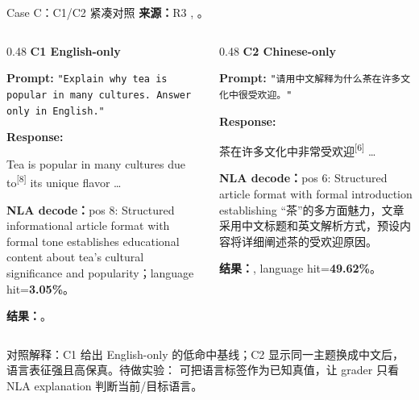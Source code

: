 \begin{frame}{Case C：C1/C2 紧凑对照}
\scriptsize
\textbf{来源：}R3 , 。

\begin{columns}[T,onlytextwidth]
\begin{column}{0.48\linewidth}
\textbf{C1 English-only}

\textbf{Prompt:} \texttt{"Explain why tea is popular in many cultures. Answer only in English."}

\textbf{Response:}

Tea is popular in many cultures due\colorbox{green!15}{ to}\textsuperscript{[{8}]} its unique flavor \dots

\vspace{1em}
\textbf{NLA decode：}pos 8: Structured informational article format with formal tone establishes educational content about tea's cultural significance and popularity；language hit=\textbf{3.05\%}。

\vspace{1em}
\textbf{结果：}。
\end{column}
\vrule{}\hspace{0.01\linewidth}
\begin{column}{0.48\linewidth}
\textbf{C2 Chinese-only}

\textbf{Prompt:} \texttt{"请用中文解释为什么茶在许多文化中很受欢迎。"}

\textbf{Response:}

茶在许多文化中非常\colorbox{green!15}{受欢迎}\textsuperscript{[{6}]} \dots

\vspace{1em}
\textbf{NLA decode：}pos 6: Structured article format with formal introduction establishing ``茶''的多方面魅力，文章采用中文标题和英文解析方式，预设内容将详细阐述茶的受欢迎原因。

\vspace{1em}
\textbf{结果：}, language hit=\textbf{49.62\%}。
\end{column}
\end{columns}

\vspace{0.3em}
\alert{对照解释：}C1 给出 English-only 的低命中基线；C2 显示同一主题换成中文后，语言表征强且高保真。待做实验： 可把语言标签作为已知真值，让 grader 只看 NLA explanation 判断当前/目标语言。
\end{frame}

